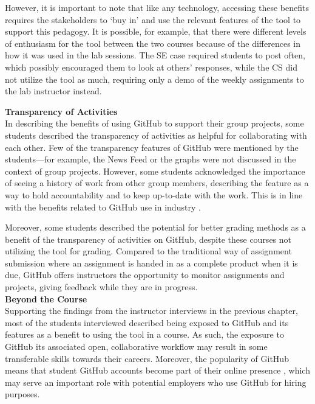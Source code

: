 However, it is important to note that like any technology, accessing these benefits requires the stakeholders to `buy in' and use the relevant features of the tool to support this pedagogy. It is possible, for example, that there were different levels of enthusiasm for the tool between the two courses because of the differences in how it was used in the lab sessions. The SE case required students to post often, which possibly encouraged them to look at others' responses, while the CS did not utilize the tool as much, requiring only a demo of the weekly assignments to the lab instructor instead.

\textbf{Transparency of Activities} \\
In describing the benefits of using GitHub to support their group projects, some students described the transparency of activities as helpful for collaborating with each other. Few of the transparency features of GitHub were mentioned by the students---for example, the News Feed or the graphs were not discussed in the context of group projects. However, some students acknowledged the importance of seeing a history of work from other group members, describing the feature as a way to hold accountability and to keep up-to-date with the work. This is in line with the benefits related to GitHub use in industry \cite{dabbish2012social}.

Moreover, some students described the potential for better grading methods as a benefit of the transparency of activities on GitHub, despite these courses not utilizing the tool for grading. Compared to the traditional way of assignment submission where an assignment is handed in as a complete product when it is due, GitHub offers instructors the opportunity to monitor assignments and projects, giving feedback while they are in progress. \\

\textbf{Beyond the Course} \\
Supporting the findings from the instructor interviews in the previous chapter, most of the students interviewed described being exposed to GitHub and its features as a benefit to using the tool in a course. As such, the exposure to GitHub its associated open, collaborative workflow may result in some transferable skills towards their careers. Moreover, the popularity of GitHub means that student GitHub accounts become part of their online presence \cite{treude2012programming}, which may serve an important role with potential employers who use GitHub for hiring purposes.

